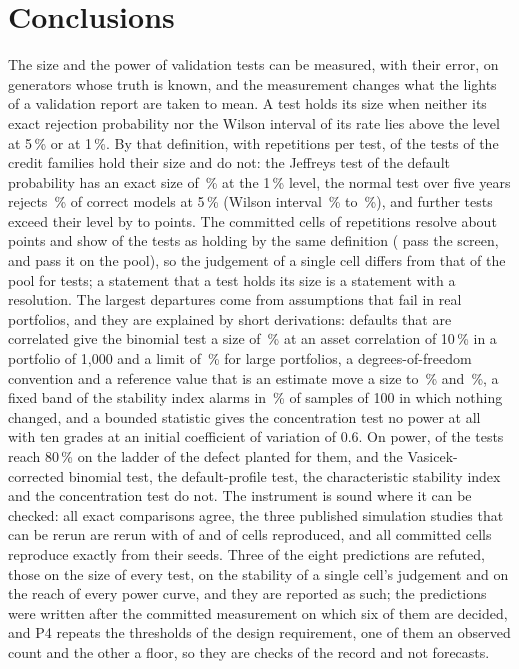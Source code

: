 \section{Conclusions}
\label{sec:conclusions}

The size and the power of validation tests can be measured, with their error, on generators whose truth is known, and the measurement changes what the lights of a validation report are taken to mean.
A test holds its size when neither its exact rejection probability nor the Wilson interval of its rate lies above the level at 5\,\% or at 1\,\%.
By that definition, with \nRepsPooled{} repetitions per test, \nHold{} of the \nTests{} tests of the credit families hold their size and \nNotHold{} do not: the Jeffreys test of the default probability has an exact size of \jeffExactOne\,\% at the 1\,\% level, the normal test over five years rejects \pooledNorm\,\% of correct models at 5\,\% (Wilson interval \pooledNormLo\,\% to \pooledNormHi\,\%), and \nSmallOver{} further tests exceed their level by \smallExcMin{} to \smallExcMax{} points.
The committed cells of \nNullReps{} repetitions resolve about \detIntFiveFour{} points and show \nHoldCellDef{} of the \nTests{} tests as holding by the same definition (\nHoldCellRule{} pass the screen, and \nHoldPoolRule{} pass it on the pool), so the judgement of a single cell differs from that of the pool for \nVerdictDisagree{} tests; a statement that a test holds its size is a statement with a resolution.
The largest departures come from assumptions that fail in real portfolios, and they are explained by short derivations: defaults that are correlated give the binomial test a size of \binRhoOneZeroExact\,\% at an asset correlation of 10\,\% in a portfolio of 1,000 and a limit of \binLimitRhoTen\,\% for large portfolios, a degrees-of-freedom convention and a reference value that is an estimate move a size to \hlFitted\,\% and \aucDevOne\,\%, a fixed band of the stability index alarms in \psiHundred\,\% of samples of 100 in which nothing changed, and a bounded statistic gives the concentration test no power at all with ten grades at an initial coefficient of variation of 0.6.
On power, \nReach{} of the \nPowerTests{} tests reach 80\,\% on the ladder of the defect planted for them, and the Vasicek-corrected binomial test, the default-profile test, the characteristic stability index and the concentration test do not.
The instrument is sound where it can be checked: all \nAgree{} exact comparisons agree, the three published simulation studies that can be rerun are rerun with \wpAgree{} of \wpTotal{} and \ynAgree{} of \ynTotal{} cells reproduced, and all \nReproTotal{} committed cells reproduce exactly from their seeds.
Three of the eight predictions are refuted, those on the size of every test, on the stability of a single cell's judgement and on the reach of every power curve, and they are reported as such; the predictions were written after the committed measurement on which six of them are decided, and P4 repeats the thresholds of the design requirement, one of them an observed count and the other a floor, so they are checks of the record and not forecasts.

